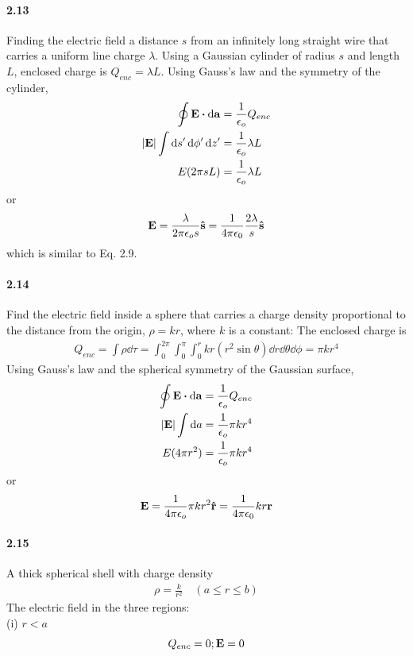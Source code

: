 \documentclass[../main.tex]{subfiles}
\begin{document}
\paragraph{2.13} \label{prob:2_13}
Finding the electric field a distance $s$ from an infinitely long straight wire that carries a
uniform line charge $\lambda$. Using a Gaussian cylinder of radius $s$ and length $L$, 
enclosed charge is $Q_{enc} = \lambda L$. Using Gauss's law and the symmetry of the cylinder,
\begin{align*}
    \oint \vb{E} \vdot \dd{\vb{a}} &= \frac{1}{\epsilon_o} Q_{enc} \\
    \abs{\vb{E}} \int \dd{s'}\dd{\phi'}\dd{z'} &= \frac{1}{\epsilon_o} \lambda L \\
    E (2\pi s L) &= \frac{1}{\epsilon_o} \lambda L
\end{align*}
or
\begin{align*}
    \vb{E} = \frac{\lambda}{2\pi\epsilon_o s} \vu{s} = \frac{1}{4\pi\epsilon_0} \frac{2\lambda}{s} \vu{s}
\end{align*}
which is similar to Eq. 2.9.

\paragraph{2.14}
Find the electric field inside a sphere that carries a charge density proportional to the distance
from the origin, $\rho = kr$, where $k$ is a constant: The enclosed charge is
\begin{align*}
    Q_{enc} = \int \rho \dd{\tau} = \int_0^{2\pi} \int_0^\pi \int_0^r kr (r^2 \sin\theta) \dd{r}
        \dd{\theta} \dd{\phi} = \pi k r^4
\end{align*}
Using Gauss's law and the spherical symmetry of the Gaussian surface,
\begin{align*}
    \oint \vb{E} \vdot \dd{\vb{a}} &= \frac{1}{\epsilon_o} Q_{enc} \\
    \abs{\vb{E}} \int \dd{a} &= \frac{1}{\epsilon_o} \pi k r^4 \\
    E (4\pi r^2) &= \frac{1}{\epsilon_o} \pi k r^4
\end{align*}
or 
\begin{align*}
    \vb{E} = \frac{1}{4\pi\epsilon_o} \pi k r^2 \vu{r} = \frac{1}{4\pi\epsilon_0} kr\vb{r}
\end{align*}

\paragraph{2.15} \label{prob:2_15}
A thick spherical shell with charge density
\begin{align*}
    \rho = \frac{k}{r^2} \quad (a\leq r \leq b)
\end{align*}
The electric field in the three regions: \\
(i) \(r<a\)
\[ Q_{enc} = 0; \vb{E} = 0 \]
\end{document}
